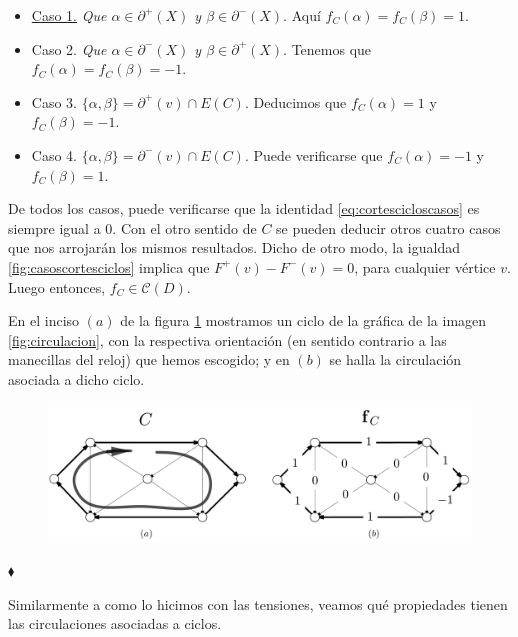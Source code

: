 \begin{itemize}
   \item \underline{Caso 1.}  \textit{Que $\alpha \in \partial^{+}(X)$ y $\beta \in \partial^{-}(X)$}. Aquí $f_{C} (\alpha)= f_{C}(\beta) = 1.$

\item {Caso 2.} \textit{Que $\alpha \in \partial^{-}(X)$ y $\beta \in \partial^{+}(X)$}. Tenemos que $f_{C} (\alpha)= f_{C}(\beta) = -1$.

\item {Caso 3.} $\{\alpha, \beta\} = \partial^{+}(v) \cap E(C)$. Deducimos que $f_{C}(\alpha)=1$ y $f_{C}(\beta)=-1.$

\item {Caso 4.} $\{\alpha, \beta\} = \partial^{-}(v) \cap E(C)$. Puede verificarse que $f_{C}(\alpha)= -1$ y $f_{C}(\beta)=1.$ 
\end{itemize}


De todos los casos, puede verificarse que la identidad \ref{eq:cortescicloscasos} es siempre igual a $0$. Con el otro sentido de $C$ se pueden deducir otros cuatro casos que nos arrojarán los mismos resultados. Dicho de otro modo, la igualdad \ref{fig:casoscortesciclos} implica que $F^{+}(v) - F^{-}(v) = 0$, para cualquier vértice $v$. Luego entonces, $f_{C} \in \mathcal{C}(D)$. 

\begin{ejem}
En el inciso $(a)$ de la figura \ref{fig:circulacionciclo} mostramos un ciclo de la gráfica de la imagen \ref{fig:circulacion}, con la respectiva orientación (en sentido contrario a las manecillas del reloj) que hemos escogido; y en $(b)$ se halla la circulación asociada a dicho ciclo.
\begin{figure}[H]
    \centering
    \includegraphics[scale=0.19]{img/imgchapter2/circulacionciclo.jpg}
    \caption{}
    \label{fig:circulacionciclo}
\end{figure}
\hfill $\blacklozenge$
\end{ejem}

Similarmente a como lo hicimos con las tensiones, veamos qué propiedades tienen las circulaciones asociadas a ciclos.

